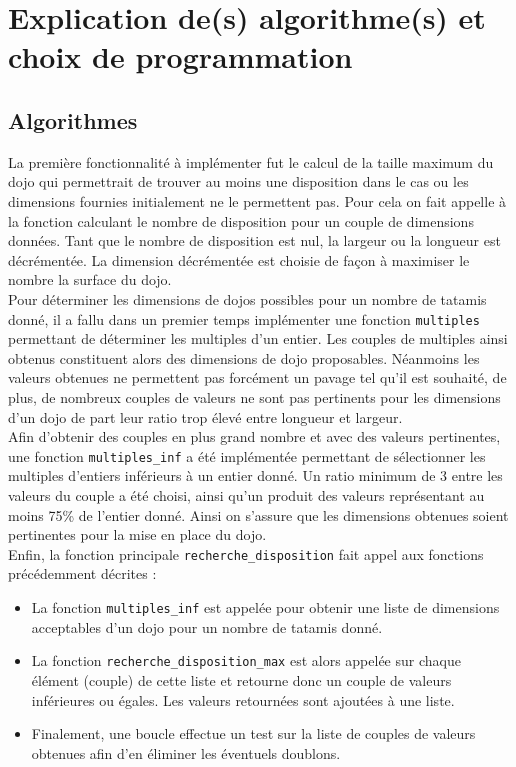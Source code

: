 \section{Explication de(s) algorithme(s) et choix de programmation}

\subsection{Algorithmes}

La première fonctionnalité à implémenter fut le calcul de la taille maximum du dojo qui permettrait de trouver au moins une disposition 
dans le cas ou les dimensions fournies initialement ne le permettent pas. Pour cela on fait appelle à la fonction calculant le nombre 
de disposition pour un couple de dimensions données. Tant que le nombre de disposition est nul, la largeur ou la longueur est décrémentée. 
La dimension décrémentée est choisie de façon à maximiser le nombre la surface du dojo.\\

Pour déterminer les dimensions de dojos possibles pour un nombre de tatamis donné, il a fallu dans un premier temps implémenter 
une fonction \texttt{multiples} permettant de déterminer les multiples d’un entier. Les couples de multiples ainsi obtenus constituent alors des dimensions 
de dojo proposables. Néanmoins les valeurs obtenues ne permettent pas forcément un pavage tel qu’il est souhaité, de plus, de nombreux 
couples de valeurs ne sont pas pertinents pour les dimensions d’un dojo de part leur ratio trop élevé entre longueur et largeur.\\

Afin d’obtenir des couples en plus grand nombre et avec des valeurs pertinentes, une fonction \texttt{multiples\_inf} a été implémentée permettant de sélectionner 
les multiples d’entiers inférieurs à un entier donné.  Un ratio minimum de 3 entre les valeurs du couple a été choisi, ainsi qu’un produit 
des valeurs représentant au moins 75\% de l’entier donné. Ainsi on s’assure que les dimensions obtenues soient pertinentes pour la mise en 
place du dojo.\\

Enfin, la fonction principale \texttt{recherche\_disposition} fait appel aux fonctions précédemment décrites :
\begin{itemize}
    \item La fonction \texttt{multiples\_inf} est appelée pour obtenir une liste de dimensions acceptables d’un dojo pour un nombre de tatamis donné.
    \item La fonction \texttt{recherche\_disposition\_max} est alors appelée sur chaque élément (couple) de cette liste et retourne donc un couple de 
    valeurs inférieures ou égales. Les valeurs retournées sont ajoutées à une liste.
    \item Finalement, une boucle effectue un test sur la liste de couples de valeurs obtenues afin d’en éliminer les éventuels doublons.
\end{itemize}




